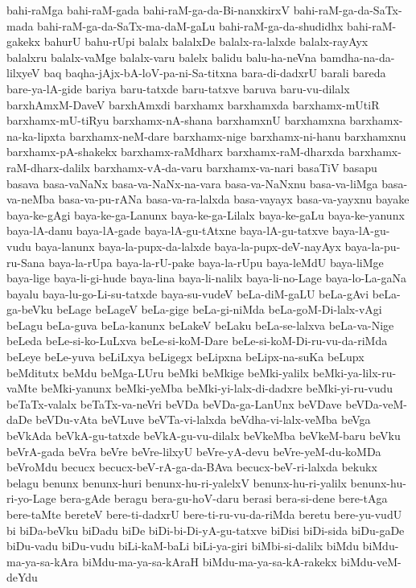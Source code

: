 {bahi-raMga
bahi-raM-gada
bahi-raM-ga-da-Bi-nanxkirxV
bahi-raM-ga-da-SaTx-mada
bahi-raM-ga-da-SaTx-ma-daM-gaLu
bahi-raM-ga-da-shudidhx
bahi-raM-gakekx
bahurU
bahu-rUpi
balalx
balalxDe
balalx-ra-lalxde
balalx-rayAyx
balalxru
balalx-vaMge
balalx-varu
balelx
balidu
balu-ha-neVna
bamdha-na-da-lilxyeV
baq
baqha-jAjx-bA-loV-pa-ni-Sa-titxna
bara-di-dadxrU
barali
bareda
bare-ya-lA-gide
bariya
baru-tatxde
baru-tatxve
baruva
baru-vu-dilalx
barxhAmxM-DaveV
barxhAmxdi
barxhamx
barxhamxda
barxhamx-mUtiR
barxhamx-mU-tiRyu
barxhamx-nA-shana
barxhamxnU
barxhamxna
barxhamx-na-ka-lipxta
barxhamx-neM-dare
barxhamx-nige
barxhamx-ni-hanu
barxhamxnu
barxhamx-pA-shakekx
barxhamx-raMdharx
barxhamx-raM-dharxda
barxhamx-raM-dharx-dalilx
barxhamx-vA-da-varu
barxhamx-va-nari
basaTiV
basapu
basava
basa-vaNaNx
basa-va-NaNx-na-vara
basa-va-NaNxnu
basa-va-liMga
basa-va-neMba
basa-va-pu-rANa
basa-va-ra-lalxda
basa-vayayx
basa-va-yayxnu
bayake
baya-ke-gAgi
baya-ke-ga-Lanunx
baya-ke-ga-Lilalx
baya-ke-gaLu
baya-ke-yanunx
baya-lA-danu
baya-lA-gade
baya-lA-gu-tAtxne
baya-lA-gu-tatxve
baya-lA-gu-vudu
baya-lanunx
baya-la-pupx-da-lalxde
baya-la-pupx-deV-nayAyx
baya-la-pu-ru-Sana
baya-la-rUpa
baya-la-rU-pake
baya-la-rUpu
baya-leMdU
baya-liMge
baya-lige
baya-li-gi-hude
baya-lina
baya-li-nalilx
baya-li-no-Lage
baya-lo-La-gaNa
bayalu
baya-lu-go-Li-su-tatxde
baya-su-vudeV
beLa-diM-gaLU
beLa-gAvi
beLa-ga-beVku
beLage
beLageV
beLa-gige
beLa-gi-niMda
beLa-goM-Di-lalx-vAgi
beLagu
beLa-guva
beLa-kanunx
beLakeV
beLaku
beLa-se-lalxva
beLa-va-Nige
beLeda
beLe-si-ko-LuLxva
beLe-si-koM-Dare
beLe-si-koM-Di-ru-vu-da-riMda
beLeye
beLe-yuva
beLiLxya
beLigegx
beLipxna
beLipx-na-suKa
beLupx
beMditutx
beMdu
beMga-LUru
beMki
beMkige
beMki-yalilx
beMki-ya-lilx-ru-vaMte
beMki-yanunx
beMki-yeMba
beMki-yi-lalx-di-dadxre
beMki-yi-ru-vudu
beTaTx-valalx
beTaTx-va-neVri
beVDa
beVDa-ga-LanUnx
beVDave
beVDa-veM-daDe
beVDu-vAta
beVLuve
beVTa-vi-lalxda
beVdha-vi-lalx-veMba
beVga
beVkAda
beVkA-gu-tatxde
beVkA-gu-vu-dilalx
beVkeMba
beVkeM-baru
beVku
beVrA-gada
beVra
beVre
beVre-lilxyU
beVre-yA-devu
beVre-yeM-du-koMDa
beVroMdu
becucx
becucx-beV-rA-ga-da-BAva
becucx-beV-ri-lalxda
bekukx
belagu
benunx
benunx-huri
benunx-hu-ri-yalelxV
benunx-hu-ri-yalilx
benunx-hu-ri-yo-Lage
bera-gAde
beragu
bera-gu-hoV-daru
berasi
bera-si-dene
bere-tAga
bere-taMte
bereteV
bere-ti-dadxrU
bere-ti-ru-vu-da-riMda
beretu
bere-yu-vudU
bi
biDa-beVku
biDadu
biDe
biDi-bi-Di-yA-gu-tatxve
biDisi
biDi-sida
biDu-gaDe
biDu-vadu
biDu-vudu
biLi-kaM-baLi
biLi-ya-giri
biMbi-si-dalilx
biMdu
biMdu-ma-ya-sa-kAra
biMdu-ma-ya-sa-kAraH
biMdu-ma-ya-sa-kA-rakekx
biMdu-veM-deYdu
}
